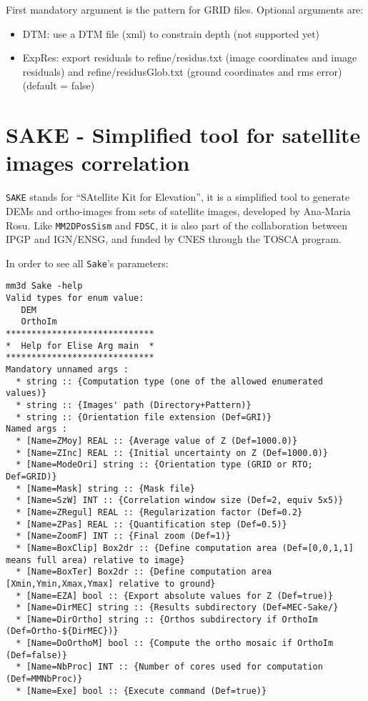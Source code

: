 First mandatory argument is the pattern for GRID files. Optional arguments are:
\begin{itemize}
\item DTM: use a DTM file (xml) to constrain depth (not supported yet)
\item ExpRes: export residuals to refine/residus.txt (image coordinates and image residuals) and refine/residusGlob.txt (ground coordinates and rms error) (default = false)
\end{itemize}

\section{SAKE - Simplified tool for satellite images correlation}

{\tt SAKE} stands for ``SAtellite Kit for Elevation'', it is a simplified tool to generate DEMs and ortho-images from sets of satellite images, developed by Ana-Maria Rosu. Like {\tt MM2DPosSism} and {\tt FDSC}, it is also part of the collaboration between IPGP and IGN/ENSG, and funded by CNES through the TOSCA program.

\vspace{0.3cm}
In order to see all {\tt Sake}'s parameters:
\begin{verbatim}
mm3d Sake -help
Valid types for enum value:
   DEM
   OrthoIm
*****************************
*  Help for Elise Arg main  *
*****************************
Mandatory unnamed args :
  * string :: {Computation type (one of the allowed enumerated values)}
  * string :: {Images' path (Directory+Pattern)}
  * string :: {Orientation file extension (Def=GRI)}
Named args :
  * [Name=ZMoy] REAL :: {Average value of Z (Def=1000.0)}
  * [Name=ZInc] REAL :: {Initial uncertainty on Z (Def=1000.0)}
  * [Name=ModeOri] string :: {Orientation type (GRID or RTO; Def=GRID)}
  * [Name=Mask] string :: {Mask file}
  * [Name=SzW] INT :: {Correlation window size (Def=2, equiv 5x5)}
  * [Name=ZRegul] REAL :: {Regularization factor (Def=0.2}
  * [Name=ZPas] REAL :: {Quantification step (Def=0.5)}
  * [Name=ZoomF] INT :: {Final zoom (Def=1)}
  * [Name=BoxClip] Box2dr :: {Define computation area (Def=[0,0,1,1] means full area) relative to image}
  * [Name=BoxTer] Box2dr :: {Define computation area [Xmin,Ymin,Xmax,Ymax] relative to ground}
  * [Name=EZA] bool :: {Export absolute values for Z (Def=true)}
  * [Name=DirMEC] string :: {Results subdirectory (Def=MEC-Sake/}
  * [Name=DirOrtho] string :: {Orthos subdirectory if OrthoIm (Def=Ortho-${DirMEC})}
  * [Name=DoOrthoM] bool :: {Compute the ortho mosaic if OrthoIm (Def=false)}
  * [Name=NbProc] INT :: {Number of cores used for computation (Def=MMNbProc)}
  * [Name=Exe] bool :: {Execute command (Def=true)}
\end{verbatim}

